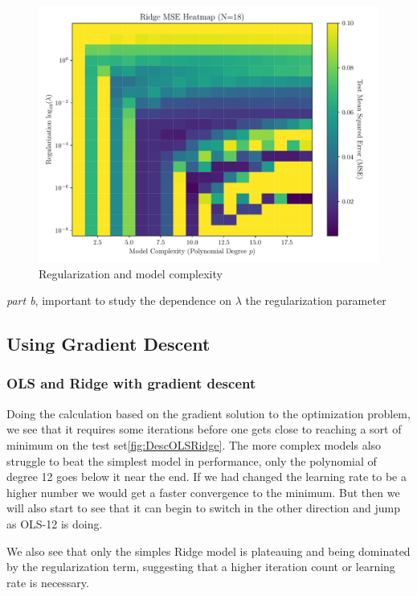 \documentclass[amssymb,twocolumn,aps]{revtex4}
\begin{document}
\begin{figure}[h]
    \centering
    \includegraphics[width=.95 \linewidth]{Figures/Ridge_Degree_Lambda_Heatmap.pdf}
    \caption{Regularization and model complexity}
    \label{fig:RidgeHeat}
\end{figure}

\textit{part b}, important to study the dependence on $\lambda$ the regularization parameter

\subsection{Using Gradient Descent}

\subsubsection{OLS and Ridge with gradient descent}

Doing the calculation based on the gradient solution to the optimization problem, we see that it requires some iterations before one gets close to reaching a sort of minimum on the test set\ref{fig:DescOLSRidge}.
The more complex models also struggle to beat the simplest model in performance, only the polynomial of degree 12 goes below it near the end.
If we had changed the learning rate to be a higher number we would get a faster convergence to the minimum.
But then we will also start to see that it can begin to switch in the other direction and jump as OLS-12 is doing.

We also see that only the simples Ridge model is plateauing and being dominated by the regularization term, suggesting that a higher iteration count or learning rate is necessary.
\end{document}

